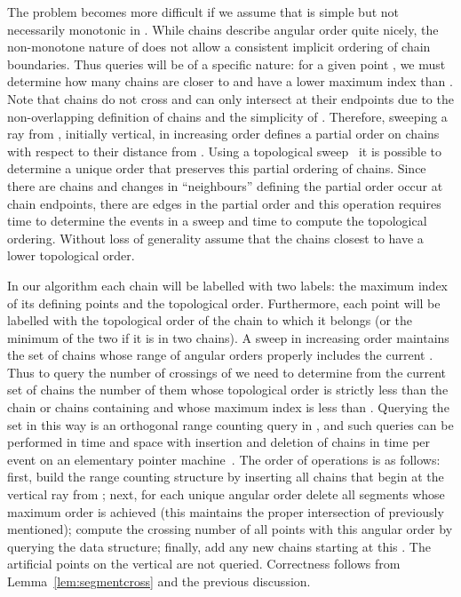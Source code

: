 \documentclass{article}
\begin{document}
The problem becomes more difficult
if we assume that  is simple but not necessarily monotonic in .
While chains describe angular order quite
nicely, the non-monotone nature of  does not allow a consistent
implicit ordering of chain boundaries.  Thus queries will be of a specific
nature: for a given point , we must determine how many chains are
closer to  and have a lower maximum index than .  Note that chains do
not cross and can only intersect at their endpoints due to the
non-overlapping definition of chains and the simplicity of .  Therefore,
sweeping a ray from , initially vertical, in increasing  order
defines a partial order on chains with respect to their distance from . 
Using a topological sweep~\cite[p.~481]{skiena:2008uq} it is possible to
determine a unique order that preserves this partial ordering of chains. 
Since there are  chains and changes in ``neighbours'' defining the
partial order occur at chain endpoints, there are  edges in the partial
order and this operation requires  time to determine the events
in a sweep and  time to compute the topological ordering.  Without
loss of generality assume that the chains closest to  have a lower
topological order.

In our algorithm each chain will be labelled with two labels: the maximum
index of its defining points and the topological order.  Furthermore, each
point  will be labelled with the topological order of the chain to which 
it belongs (or the minimum of the two if it is in two chains).  A sweep in
increasing  order maintains the set of chains whose range of angular
orders properly includes the current .  Thus to query the number
of crossings of  we need to determine from the current set of
chains the number of them whose topological order is strictly less than the
chain or chains containing  and whose maximum index is less than . 
Querying the set in this way is an orthogonal range counting query in
, and such queries can be performed in  time and
 space with insertion and deletion of chains in  time per
event on an elementary pointer machine~\cite{chazelle:1988vn}.  The order of
operations is as follows: first, build the range counting structure by
inserting all chains that begin at the vertical ray from ; next, for
each unique angular order delete all segments whose maximum  order
is achieved (this maintains the proper intersection of  previously
mentioned); compute the crossing number of all points with this angular
order by querying the data structure; finally, add any new chains starting
at this .  The artificial points on the vertical are not queried. 
Correctness follows from Lemma~\ref{lem:segmentcross} and the
previous discussion.
\end{document}
